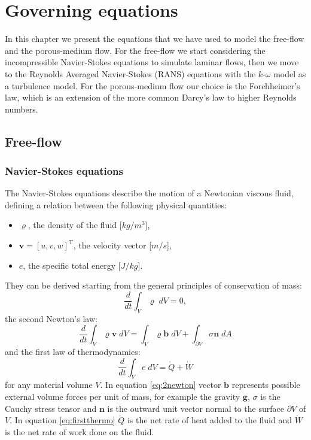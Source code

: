 \chapter{Governing equations} \label{chap:equations} %
In this chapter we present the equations that we have used to model the 
free-flow and the porous-medium flow. For the free-flow we start 
considering the incompressible Navier-Stokes equations to simulate laminar 
flows, then we move to the Reynolds Averaged Navier-Stokes (RANS) equations with the $k\text{-}\omega$ 
model as a turbulence model. For the porous-medium 
flow our choice is the Forchheimer's law, which is an extension of the more 
common Darcy's law to higher Reynolds numbers.
\section{Free-flow}
\subsection{Navier-Stokes equations}
The Navier-Stokes equations describe the motion of a Newtonian viscous fluid,
defining a relation between the following physical quantities:
\begin{itemize}
	\item $\varrho$, the density of the fluid  [$\si{kg/m^3}$],
	\item $\mathbf{v} = [u, v, w]^\mathrm{T}$, the velocity vector [$\si{m/s}$],
	\item $e$, the specific total energy [$\si{J/kg}$].
\end{itemize}
They can be derived starting from the general principles of conservation of 
mass:
\begin{equation} \label{eq:masscons}
\frac{d}{dt} \int_V \varrho \; dV = 0,
\end{equation}
the second Newton's law:
\begin{equation} \label{eq:2newton}
\frac{d}{dt} \int_V \varrho \mathbf{v} \; dV = \int_V \varrho \mathbf{b} \; dV 
+ 
\int_{\partial V} \sigma \mathbf{n} \; dA
\end{equation}
and the first law of thermodynamics:
\begin{equation} \label{eq:firstthermo}
\frac{d}{dt} \int_V e \; dV = \dot{Q} + \dot{W}
\end{equation}
for any material volume $V$. In equation \eqref{eq:2newton} vector 
$\mathbf{b}$ represents possible external volume forces per unit of mass, for 
example the gravity $\mathbf{g}$, $\sigma$ is the Cauchy stress tensor 
and 
$\mathbf{n}$ is the outward unit vector normal to the surface $\partial V$ of 
$V$. In equation \eqref{eq:firstthermo} $\dot{Q}$ is the net rate of 
heat added to the fluid and $\dot{W}$ is the net rate of work done on the fluid.

